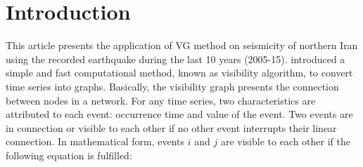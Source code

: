 \section{Introduction}
\noindent
This article presents the application of VG method on seismicity of northern Iran using the recorded earthquake during the last 10 years (2005-15). \citet{Lacasa2008} introduced a simple and fast computational method, known as visibility algorithm, to convert time series into graphs. Basically, the visibility graph presents the connection between nodes in a network. For any time series, two characteristics are attributed to each event: occurrence time and value of the event. Two events are in connection or visible to each other if no other event interrupts their linear connection. In mathematical form, events $i$ and $j$ are visible to each other if the following equation is fulfilled:


